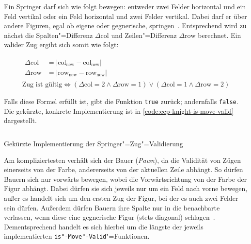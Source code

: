 
Ein Springer darf sich wie folgt bewegen: entweder zwei Felder horizontal und ein Feld vertikal oder ein Feld horizontal und zwei Felder vertikal. Dabei darf er über andere Figuren, egal ob eigene oder gegnerische, springen~\cite{justUSChessFederations2019}. Entsprechend wird zu nächst die Spalten"=Differenz $\Delta\text{col}$ und Zeilen"=Differenz $\Delta\text{row}$ berechnet. Ein valider Zug ergibt sich somit wie folgt:

\vspace{-1em}
\begin{gather*}
    \begin{aligned}
        \Delta\text{col} &= \vert \text{col}_{\text{new}} - \text{col}_{\text{new}} \vert \\
        \Delta\text{row} &= \vert \text{row}_{\text{new}} - \text{row}_{\text{new}} \vert
    \end{aligned}
    \\
    \text{Zug ist gültig} \iff (\Delta\text{col} = 2 \land \Delta\text{row} = 1) \lor (\Delta\text{col} = 1 \land \Delta\text{row} = 2)
\end{gather*}

Falls diese Formel erfüllt ist, gibt die Funktion \texttt{true} zurück; andernfalls \texttt{false}. Die gekürzte, konkrete Implementierung ist in \autoref{code:ecp-knight-is-move-valid} dargestellt.

\begin{listing}[h]
    \inputminted{cpp}{../assets/code/ECPKnight-isMoveValid.cpp}
    \caption{Gekürzte Implementierung der Springer"=Zug"=Validierung}
    \label{code:ecp-knight-is-move-valid}
\end{listing}


Am kompliziertesten verhält sich der Bauer (\emph{Pawn}), da die Validität von Zügen einerseits von der Farbe, andererseits von der aktuellen Zeile abhängt. So dürfen Bauern sich nur vorwärts bewegen, wobei die Vorwärtsrichtung von der Farbe der Figur abhängt. Dabei dürfen sie sich jeweils nur um ein Feld nach vorne bewegen, außer es handelt sich um den ersten Zug der Figur, bei der es auch zwei Felder sein dürfen. Außerdem dürfen Bauern ihre Spalte nur in die benachbarte verlassen, wenn diese eine gegnerische Figur (stets diagonal) schlagen~\cite{justUSChessFederations2019}. Dementsprechend handelt es sich hierbei um die längste der jeweils implementierten \texttt{is"-Move"-Valid}"=Funktionen.

